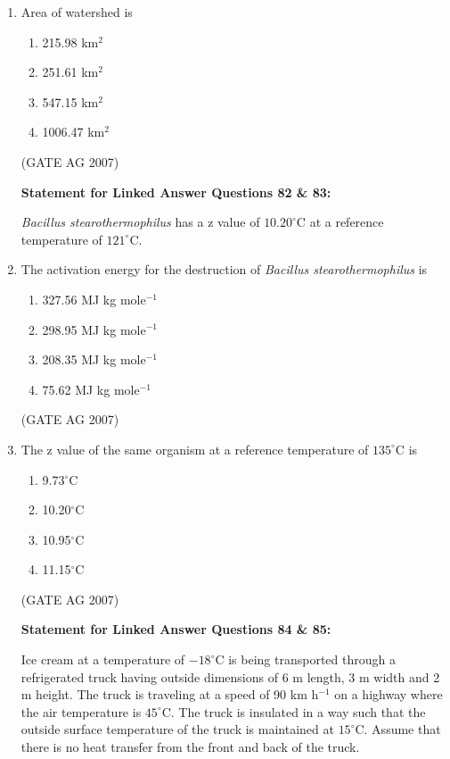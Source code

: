 \documentclass[journal,12pt,onecolumn]{IEEEtran}
\theoremstyle{remark}
\begin{document}
\begin{enumerate}[label=Q\arabic*:]
\item Area of watershed is


\begin{multicols}{4}
\begin{enumerate}
\item 215.98 km$^{2}$
\item 251.61 km$^{2}$
\item 547.15 km$^{2}$
\item 1006.47 km$^{2}$
\end{enumerate}
\end{multicols}
\hfill(GATE AG 2007)

\textbf{Statement for Linked Answer Questions 82 \& 83:}

\textit{Bacillus stearothermophilus} has a z value of $10.20^\circ$C at a reference temperature of $121^\circ$C.

\item The activation energy for the destruction of \textit{Bacillus stearothermophilus} is

\begin{multicols}{4}
\begin{enumerate}
\item 327.56 MJ kg mole$^{-1}$
\item 298.95 MJ kg mole$^{-1}$
\item 208.35 MJ kg mole$^{-1}$
\item 75.62 MJ kg mole$^{-1}$
\end{enumerate}
\end{multicols}
\hfill(GATE AG 2007)


\item The z value of the same organism at a reference temperature of $135^\circ$C is

\begin{multicols}{4}
\begin{enumerate}
\item 9.73$^\circ$C
\item 10.20$^\circ$C
\item 10.95$^\circ$C
\item 11.15$^\circ$C
\end{enumerate}
\end{multicols}
\hfill(GATE AG 2007)

\textbf{Statement for Linked Answer Questions 84 \& 85:}

Ice cream at a temperature of $-18^\circ$C is being transported through a refrigerated truck having outside dimensions of 6 m length, 3 m width and 2 m height. The truck is traveling at a speed of 90 km h$^{-1}$ on a highway where the air temperature is $45^\circ$C. The truck is insulated in a way such that the outside surface temperature of the truck is maintained at $15^\circ$C. Assume that there is no heat transfer from the front and back of the truck.


\end{enumerate}
\end{document}

